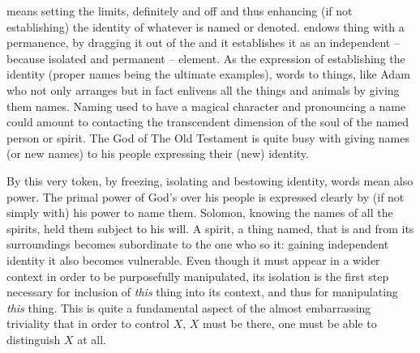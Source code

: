 
\pa {} means setting the limits, definitely and
 off and thus enhancing (if not establishing) the identity
of whatever is named or denoted.  endows thing with a permanence,
by dragging it out of the  and  it establishes it as an
independent -- because isolated and permanent -- element.  As the expression of
establishing the identity (proper names being the ultimate examples), words
 to things, like Adam who not only arranges but in fact enlivens
all the things and animals by giving them names.  Naming used to have a magical
character and pronouncing a name could amount to contacting the transcendent
dimension of the soul of the named person or spirit. The God of The Old
Testament is quite busy with giving names (or new names) to his people
expressing their (new) identity.

\label{pa:wordsPower}  
By this very token, by freezing, isolating and bestowing identity, words mean
also power. The primal power of God's over his people is expressed clearly by
(if not simply  with) his power to name them. Solomon, knowing
the names of all the spirits, held them subject to his will.
A spirit, a thing named, that is  and  from its surroundings
becomes subordinate to the one who so  it: gaining independent identity
it also becomes vulnerable.  Even though it must appear in
a wider context in order to be purposefully manipulated, its isolation is the
first step necessary for inclusion of {\em this} thing into its 
context, and thus for manipulating {\em this} thing. This is quite a fundamental
aspect of the almost embarrassing triviality that in order to control $X$, $X$
must be there, one must be able to distinguish $X$ at all.


